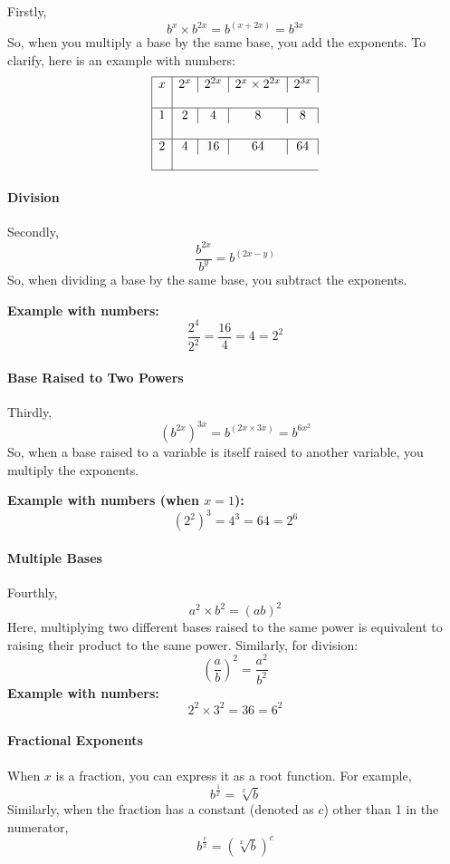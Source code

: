 Firstly,
$$
b^x \times b^{2x} = b^{(x + 2x)} = b^{3x}
$$
So, when you multiply a base by the same base, you add the exponents. To clarify, here is an example with numbers:
$$
\begin{array}{|c|c|c|c|c|} \hline
x & 2^{x} & 2^{2x} & 2^{x} \times 2^{2x} & 2^{3x} \\\\ 
\hline
1 & 2 & 4 & 8 & 8 \\\\ 
\hline
2 & 4 & 16 & 64 & 64 \\\\ 
\hline
\end{array}
$$
\paragraph{Division}

Secondly,
$$
\frac{b^{2x}}{b^y} = b^{(2x - y)}
$$
So, when dividing a base by the same base, you subtract the exponents.

\textbf{Example with numbers:}
$$
\frac{2^4}{2^2} = \frac{16}{4} = 4 = 2^2
$$
\paragraph{Base Raised to Two Powers}

Thirdly,
$$
\left(b^{2x}\right)^{3x} = b^{(2x \times 3x)} = b^{6x^2}
$$
So, when a base raised to a variable is itself raised to another variable, you multiply the exponents.

\textbf{Example with numbers (when $x = 1$):}
$$
\left(2^2\right)^3 = 4^3 = 64 = 2^6
$$
\paragraph{Multiple Bases}

Fourthly,
$$
a^2 \times b^2 = (ab)^2
$$
Here, multiplying two different bases raised to the same power is equivalent to raising their product to the same power. Similarly, for division:
$$
\left(\frac{a}{b}\right)^2 = \frac{a^2}{b^2}
$$
\textbf{Example with numbers:}
$$
2^2 \times 3^2 = 36 = 6^2
$$
\paragraph{Fractional Exponents}

When $x$ is a fraction, you can express it as a root function. For example,
$$
b^{\frac{1}{x}} = \sqrt[x]{b}
$$
Similarly, when the fraction has a constant (denoted as $c$) other than 1 in the numerator,
$$
b^{\frac{c}{x}} = \left(\sqrt[x]{b}\right)^c
$$
